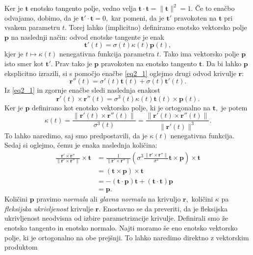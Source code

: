 \documentclass[12pt,a4paper,twoside]{article}
\theoremstyle{definition} %
\theoremstyle{plain} %
\theoremstyle{primerstyle}
\numberwithin{equation}{section}  %
\newcommand{\tV}{\mathbf{t}}
\newcommand{\pV}{\mathbf{p}}
\newcommand{\rV}{\mathbf{r}}
\begin{document}
Ker je $\tV$ enotsko tangento polje, vedno velja $\tV \cdot \tV=\lVert \tV \rVert^2 =1.$ Če to enačbo odvajamo, dobimo, da je $\tV' \cdot \tV=0,$ kar pomeni, da je $\tV'$ pravokoten na $\tV$ pri vsakem parametru $t.$ Torej lahko (implicitno) definiramo enotsko vektorsko polje $\pV$ na naslednji način: odvod enotske tangente je enak
\begin{equation}
	\label{eq2_5}
	\tV'(t)=\sigma(t)\kappa(t)\pV(t),
\end{equation}
kjer je $t\mapsto\kappa(t)$ nenegativna funkcija parametra $t.$ Tako ima vektorsko polje $\pV$ isto smer kot $\tV'.$ Prav tako je $\pV$ pravokoten na enotsko tangento $\tV.$ Da bi lahko $\pV$ eksplicitno izrazili, si s pomočjo enačbe \eqref{eq2_1} oglejmo drugi odvod krivulje $\rV$:
\begin{equation}
	\label{eq2_6}
	\rV''(t)=\sigma'(t)\tV(t)+\sigma(t)\tV'(t).
\end{equation}
Iz \eqref{eq2_1} in zgornje enačbe sledi naslednja enakost
\begin{equation}
	\label{eq2_7}
	\rV'(t) \times \rV''(t)=\sigma^3(t)\kappa(t)\tV(t) \times \pV(t).
\end{equation}
Ker je $\pV$ definirano kot enotsko vektorsko polje, ki je ortogonalno na $\tV,$ je potem
\begin{equation}
	\label{kappa1}
	\kappa(t)=\frac{\lVert \rV'(t) \times \rV''(t) \rVert}{\sigma^3(t)}=\frac{\lVert \rV'(t) \times \rV''(t) \rVert}{\lVert \rV'(t) \rVert^3}.
\end{equation}
To lahko naredimo, saj smo predpostavili, da je $\kappa(t)$ nenegativna funkcija. Sedaj si oglejmo, čemu je enaka naslednja količina:
\begin{align}
	\frac{\rV'\times \rV''}{\lVert \rV'\times \rV'' \rVert} \times \tV &= \frac{1}{\lVert \rV'\times \rV'' \rVert} \left ( \sigma^3 \frac{\lVert \rV'\times \rV'' \rVert}{\sigma^3}\tV \times \pV\right ) \times \tV \nonumber \\
	&= (\tV \times \pV) \times \tV \nonumber \\
	&= -(\tV \cdot \pV)\tV + (\tV \cdot \tV)\pV \label{normala} \\
	&= \pV. \nonumber
\end{align}
Količini $\pV$ pravimo \textit{normala} ali \textit{glavna normala} na krivuljo $\rV,$ količini $\kappa$ pa \textit{fleksijska ukrivljenost} krivulje $\rV.$ Enostavno se da preveriti, da je fleksijska ukrivljenost neodvisna od izbire parametrizacije krivulje.
Definirali smo že enotsko tangento in enotsko normalo. Najti moramo še eno enotsko vektorsko polje, ki je ortogonalno na obe prejšnji. To lahko naredimo direktno z vektorskim produktom
\end{document}
